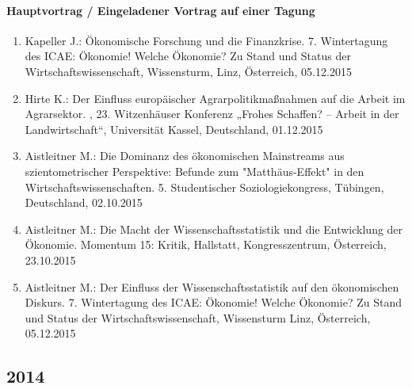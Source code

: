 \paragraph{Hauptvortrag / Eingeladener Vortrag auf einer Tagung}
\begin{enumerate}
	\item Kapeller J.: Ökonomische Forschung und die Finanzkrise. 7. Wintertagung des ICAE: Ökonomie! Welche Ökonomie? Zu Stand und Status der Wirtschaftswissenschaft, Wissensturm, Linz, Österreich, 05.12.2015
	\item Hirte K.: Der Einfluss europäischer Agrarpolitikmaßnahmen auf die Arbeit im Agrarsektor. , 23. Witzenhäuser Konferenz „Frohes Schaffen? – Arbeit in der Landwirtschaft“, Universität Kassel, Deutschland, 01.12.2015
	\item Aistleitner M.: Die Dominanz des ökonomischen Mainstreams aus szientometrischer Perspektive: Befunde zum "Matthäus-Effekt" in den Wirtschaftswissenschaften. 5. Studentischer Soziologiekongress, Tübingen, Deutschland, 02.10.2015
	\item Aistleitner M.: Die Macht der Wissenschaftsstatistik und die Entwicklung der Ökonomie. Momentum 15: Kritik, Hallstatt, Kongresszentrum, Österreich, 23.10.2015
	\item Aistleitner M.: Der Einfluss der Wissenschaftsstatistik auf den ökonomischen Diskurs. 7. Wintertagung des ICAE: Ökonomie! Welche Ökonomie? Zu Stand und Status der Wirtschaftswissenschaft, Wissensturm Linz, Österreich, 05.12.2015
\end{enumerate}
\subsection*{2014}
